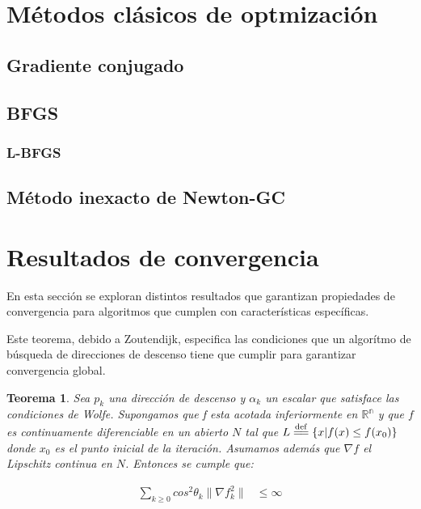 \documentclass{book}
\theoremstyle{plain}
\newtheorem{thm}{Teorema}[section]
\theoremstyle{definition}
\theoremstyle{remark}
\newcommand{\eqdef}{\overset{\mathrm{def}}{=\joinrel=}}
\begin{document}
\begin{subappendices}

\section{Métodos clásicos de optmización}

\subsection{Gradiente conjugado}

\subsection{BFGS}

\subsubsection{L-BFGS}

\subsection{Método inexacto de Newton-GC}

\section{Resultados de convergencia}

En esta sección se exploran distintos resultados que garantizan propiedades de convergencia para algoritmos que cumplen con características específicas. 

Este teorema, debido a Zoutendijk, especifica las condiciones que un algorítmo de búsqueda de direcciones de descenso tiene que cumplir para garantizar convergencia global. 

\begin{thm}
Sea $p_k$ una dirección de descenso y $\alpha_k$ un escalar que satisface las condiciones de Wolfe. Supongamos que f esta acotada inferiormente en $\mathbb{R^n}$ y que $f$ es continuamente diferenciable en un abierto $N$ tal que $L\eqdef\{x|f(x)\leq f(x_0)\}$ donde $x_0$ es el punto inicial de la iteración. Asumamos además que $\nabla f$ el Lipschitz continua en $N$. Entonces se cumple que:

\begin{equation*}
\begin{split}
\displaystyle\sum_{k\geq0}cos^2\theta_k\|\nabla f_k^2\| & \leq \infty
\end{split}
\end{equation*}
\end{thm}


\end{subappendices}
\end{document}
